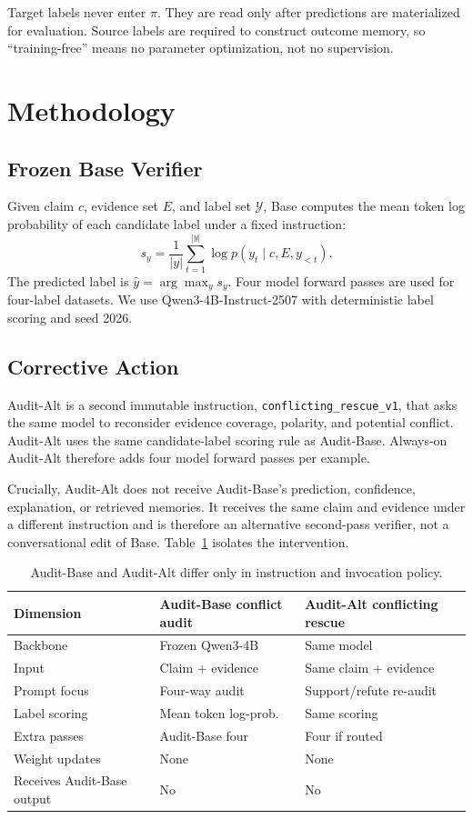 \documentclass[runningheads]{llncs}
\begin{document}
Target labels never enter $\pi$. They are read only after predictions are
materialized for evaluation. Source labels are required to construct outcome
memory, so ``training-free'' means no parameter optimization, not no
supervision.

\section{Methodology}

\subsection{Frozen Base Verifier}

Given claim $c$, evidence set $E$, and label set $\mathcal{Y}$, Base computes the
mean token log probability of each candidate label under a fixed instruction:
\begin{equation}
s_y = \frac{1}{|y|}\sum_{t=1}^{|y|}\log p(y_t\mid c,E,y_{<t}).
\end{equation}
The predicted label is $\hat{y}=\arg\max_y s_y$. Four model forward passes are
used for four-label datasets. We use Qwen3-4B-Instruct-2507 with deterministic
label scoring and seed 2026.

\subsection{Corrective Action}

Audit-Alt is a second immutable instruction, \texttt{conflicting\_rescue\_v1}, that
asks the same model to reconsider evidence coverage, polarity, and potential
conflict. Audit-Alt uses the same candidate-label scoring rule as Audit-Base. Always-on Audit-Alt
therefore adds four model forward passes per example.

Crucially, Audit-Alt does not receive Audit-Base's prediction, confidence, explanation, or
retrieved memories. It receives the same claim and evidence under a different
instruction and is therefore an alternative second-pass verifier, not a
conversational edit of Base. Table~\ref{tab:b1a3} isolates the intervention.

\begin{table}[t]
\caption{Audit-Base and Audit-Alt differ only in instruction and invocation policy.}
\label{tab:b1a3}
\centering\small
\begin{tabular}{lll}
\toprule
Dimension & Audit-Base conflict audit & Audit-Alt conflicting rescue \\
\midrule
Backbone & Frozen Qwen3-4B & Same model \\
Input & Claim + evidence & Same claim + evidence \\
Prompt focus & Four-way audit & Support/refute re-audit \\
Label scoring & Mean token log-prob. & Same scoring \\
Extra passes & Audit-Base four & Four if routed \\
Weight updates & None & None \\
Receives Audit-Base output & No & No \\
\bottomrule
\end{tabular}
\end{table}
\end{document}
